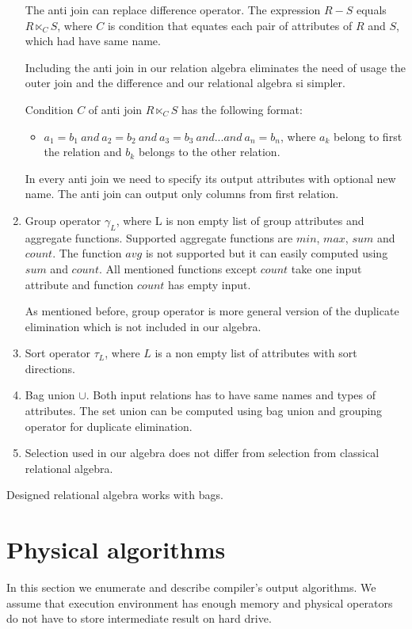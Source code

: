 \begin{enumerate}
The anti join can replace difference operator. The expression $R-S$ equals $R \ltimes_C S$, where $C$ is condition that equates each pair of attributes of $R$ and $S$, which had have same name.
 
Including the anti join in our relation algebra eliminates the need of usage the outer join and the difference and our relational algebra si simpler.

Condition $C$ of anti join $R \ltimes_C S$ has the following format:
\begin{itemize}
\item $a_1=b_1~and~a_2=b_2~and~a_3=b_3~and...and~a_n=b_n$, where $a_k$ belong to first the relation and $b_k$ belongs to the other relation.
\end{itemize}
In every anti join we need to specify its output attributes with optional new name. The anti join can output only columns from first relation. 
\item Group operator $\gamma_L$, where L is non empty list of group attributes and aggregate functions. Supported aggregate functions are $min$, $max$, $sum$ and $count$. The function $avg$ is not supported but it can easily computed using $sum$ and $count$. All mentioned functions except $count$ take one input attribute and function $count$ has empty input. 

As mentioned before, group operator is more general version of the duplicate elimination which is not included in our algebra.
\item Sort operator $\tau_L$, where $L$ is a non empty list of attributes with sort directions.
\item Bag union $\cup$. Both input relations has to have same names and types of attributes. The set union can be computed using bag union and grouping operator for duplicate elimination.
\item Selection used in our algebra does not differ from selection from classical relational algebra.

\end{enumerate}

Designed relational algebra works with bags.

\section{Physical algorithms}

In this section we enumerate and describe compiler's output algorithms. We assume that execution environment has enough memory and physical operators do not have to store intermediate result on hard drive.

